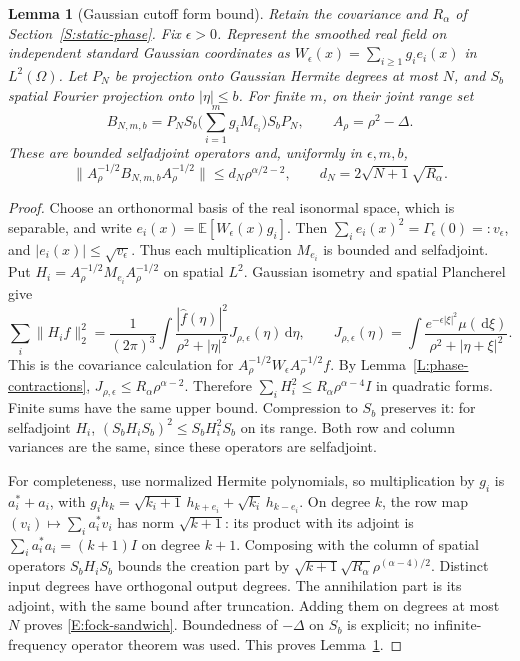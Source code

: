 \documentclass[12pt]{article}
\numberwithin{equation}{section}
\newtheorem{lemma}[theorem]{Lemma}
\theoremstyle{definition}
\newcommand{\E}{\mathbb{E}}
\newcommand{\ud}{\,\mathrm{d}}
\begin{document}
\begin{lemma}[Gaussian cutoff form bound]\label{L:fock-form}
  Retain the covariance and $R_\alpha$ of
  Section~\ref{S:static-phase}. Fix $\epsilon>0$.
  Represent the smoothed real field on independent standard Gaussian
  coordinates as $W_\epsilon(x)=\sum_{i\ge1}g_i e_i(x)$ in $L^2(\Omega)$.
  Let $P_N$ be projection onto Gaussian Hermite degrees at most $N$,
  and $S_b$ spatial Fourier projection onto $|\eta|\le b$.
  For finite $m$, on their joint range set
  \[
    B_{N,m,b}=P_NS_b\Big(\sum_{i=1}^m g_i M_{e_i}\Big)S_bP_N,\qquad
    A_\rho=\rho^2-\Delta .
  \]
  These are bounded selfadjoint operators and, uniformly in
  $\epsilon,m,b$,
  \begin{equation}\label{E:fock-sandwich}
    \|A_\rho^{-1/2}B_{N,m,b}A_\rho^{-1/2}\|
    \le d_N\rho^{\alpha/2-2},\qquad
    d_N=2\sqrt{N+1}\sqrt{R_\alpha}.
  \end{equation}
\end{lemma}

\begin{proof}
  Choose an orthonormal basis of the real isonormal space, which is
  separable, and write $e_i(x)=\E[W_\epsilon(x)g_i]$.
  Then $\sum_i e_i(x)^2=\Gamma_\epsilon(0)=:v_\epsilon$, and
  $|e_i(x)|\le\sqrt{v_\epsilon}$. Thus each multiplication $M_{e_i}$
  is bounded and selfadjoint. Put
  $H_i=A_\rho^{-1/2}M_{e_i}A_\rho^{-1/2}$ on spatial $L^2$.
  Gaussian isometry and spatial Plancherel give
  \[
    \sum_i\|H_i f\|_2^2
    =\frac1{(2\pi)^3}\int
    \frac{|\widehat f(\eta)|^2}{\rho^2+|\eta|^2}
    J_{\rho,\epsilon}(\eta)\ud\eta,\qquad
    J_{\rho,\epsilon}(\eta)
    =\int\frac{e^{-\epsilon|\xi|^2}\mu(\ud\xi)}
    {\rho^2+|\eta+\xi|^2}.
  \]
  This is the covariance calculation for
  $A_\rho^{-1/2}W_\epsilon A_\rho^{-1/2}f$.
  By Lemma~\ref{L:phase-contractions},
  $J_{\rho,\epsilon}\le R_\alpha\rho^{\alpha-2}$.
  Therefore
  $\sum_i H_i^2\le R_\alpha\rho^{\alpha-4}I$
  in quadratic forms. Finite sums have the same upper bound.
  Compression to $S_b$ preserves it: for selfadjoint $H_i$,
  $(S_bH_iS_b)^2\le S_bH_i^2S_b$ on its range.
  Both row and column variances are the same, since these
  operators are selfadjoint.

  For completeness, use normalized Hermite polynomials, so multiplication
  by $g_i$ is $a_i^*+a_i$, with
  $g_i h_k=\sqrt{k_i+1}\,h_{k+e_i}+\sqrt{k_i}\,h_{k-e_i}$.
  On degree $k$, the row map $(v_i)\mapsto\sum_i a_i^*v_i$
  has norm $\sqrt{k+1}$: its product with its adjoint is
  $\sum_i a_i^*a_i=(k+1)I$ on degree $k+1$.
  Composing with the column of spatial operators $S_bH_iS_b$ bounds
  the creation part by
  $\sqrt{k+1}\sqrt{R_\alpha}\rho^{(\alpha-4)/2}$.
  Distinct input degrees have orthogonal output degrees.
  The annihilation part is its adjoint, with the same bound after
  truncation. Adding them on degrees at most $N$ proves
  \eqref{E:fock-sandwich}. Boundedness of $-\Delta$ on $S_b$ is explicit;
  no infinite-frequency operator theorem was used.
  This proves Lemma~\ref{L:fock-form}.
\end{proof}
\end{document}
